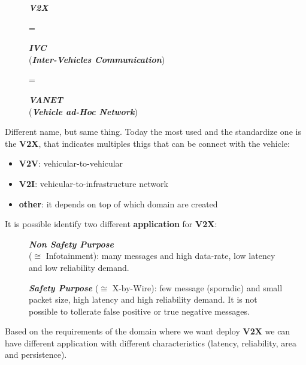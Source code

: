 \begin{figure}[h]
    \centering
    \begin{minipage}[t]{0.3\textwidth}
        \centering
        \textbf{\textit{V2X}}
    \end{minipage}
    =
    \begin{minipage}[t]{0.3\textwidth}
        \centering
        \textbf{\textit{IVC}} \\ 
        (\textbf{\textit{Inter-Vehicles Communication}})
    \end{minipage}
    =
    \begin{minipage}[t]{0.3\textwidth}
        \centering
        \textbf{\textit{VANET}} \\ 
        (\textbf{\textit{Vehicle ad-Hoc Network}})
    \end{minipage}
\end{figure}
Different name, but same thing. Today the most used and the standardize one is the \textbf{V2X}, that indicates multiples thigs that can be connect with the vehicle:
\begin{itemize}[nosep]
    \item \textbf{V2V}: vehicular-to-vehicular
    \item \textbf{V2I}: vehicular-to-infrastructure network
    \item \textbf{other}: it depends on top of which domain are created
\end{itemize}
It is possible identify two different \textbf{application} for \textbf{V2X}:

\begin{figure}[h]
    \centering
    \begin{minipage}[t]{0.35\textwidth}
        \centering
        \textbf{\textit{Non Safety Purpose}} \\ ($\cong$ Infotainment): many messages and high data-rate, low latency and low reliability demand.
    \end{minipage}
    \begin{minipage}[t]{0.55\textwidth}
        \centering
        \textbf{\textit{Safety Purpose}} ($\cong$ X-by-Wire): few message (sporadic) and small packet size, high latency and high reliability demand. It is not possible to tollerate false positive or true negative messages.
    \end{minipage}
\end{figure}
Based on the requirements of the domain where we want deploy \textbf{V2X} we can have different application with different characteristics (latency, reliability, area and persistence).

